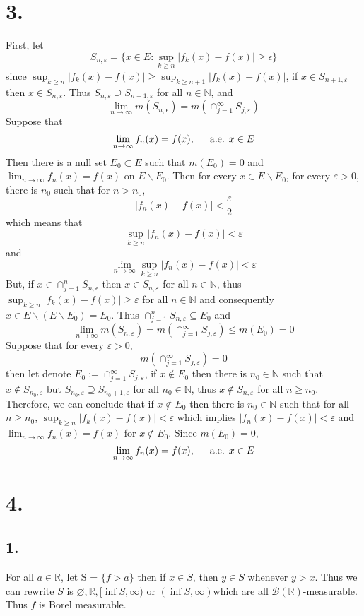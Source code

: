\documentclass[11pt]{article}
\theoremstyle{mystyle}
\theoremstyle{definition}
\begin{document}
\section*{3.}
First, let 
\[
  S_{n, \varepsilon} = \{x \in E: \sup_{k \ge n} |f_k(x) - f(x)| \ge \epsilon\}
\]
since $\sup_{k \ge n} |f_k(x) - f(x)| \ge \sup_{k \ge n+1} |f_k(x)-f(x)|$, if $x \in S_{n+1, \varepsilon}$ then $x \in S_{n, \varepsilon}$. Thus $S_{n, \varepsilon} \supseteq S_{n+1, \varepsilon}$ for all $n \in \mathbb{N}$, and 
\[
  \lim_{n \to \infty} m(S_{n, \epsilon}) = m(\cap_{j=1}^\infty S_{j, \varepsilon}) 
\]
Suppose that 
\[
  \lim_{n \to \infty} f_n(x) = f(x), \indent \text{a.e. } x \in E
\]
Then there is a null set $E_0 \subset E$ such that $m(E_0) = 0$ and $\lim_{n \to \infty} f_n(x) = f(x)$ on $E \backslash E_0$. Then for every $x \in E \backslash E_0$, for every $\varepsilon >0$, there is $n_0$ such that for $n>n_0$, 
\[
  |f_n(x) - f(x) | <\frac{\varepsilon}{2}
\]
which means that  
\[
  \sup_{k \ge n} |f_n(x) - f(x)| < \varepsilon
\]
and 
\[
  \lim_{n \to \infty} \sup_{k \ge n} |f_n(x) - f(x) | < \varepsilon
\]
But, if $x \in \cap_{j=1}^n S_{n, \epsilon}$ then $x \in S_{n, \varepsilon}$ for all $n \in \mathbb{N}$, thus $\sup_{k \ge n} |f_k(x) - f(x)| \ge \varepsilon$ for all $n \in \mathbb{N}$ and consequently $x \in E \backslash (E \backslash E_0) = E_0$. Thus $\cap_{j=1}^n S_{n, \varepsilon} \subseteq E_0$ and 
\[
  \lim_{n \to \infty} m(S_{n, \varepsilon}) = m(\cap_{j=1}^\infty S_{j, \varepsilon}) \le m(E_0) = 0 
\]
Suppose that for every $\varepsilon > 0$,  
\[
  m(\cap_{j=1}^\infty S_{j, \varepsilon}) = 0
\]
then let denote $E_0:= \cap_{j=1}^\infty S_{j, \varepsilon}$, if $x \notin E_0$ then there is $n_0 \in \mathbb{N}$ such that $x \notin S_{n_0, \varepsilon}$ but $S_{n_0, \varepsilon} \supseteq S_{n_0+1, \varepsilon}$ for all $n_0 \in \mathbb{N}$, thus $x \notin S_{n, \varepsilon}$ for all $n \ge n_0$. \\ 
Therefore, we can conclude that if $x \notin E_0$ then there is $n_0 \in \mathbb{N}$ such that for all $n \ge n_0$, $\sup_{k \ge n} |f_k(x) - f(x)| < \varepsilon$ which implies $|f_n(x) - f(x) | < \varepsilon$ and $\lim_{n \to \infty} f_n(x) = f(x)$ for $x \notin E_0$. Since $m(E_0) = 0$, 
\[
  \lim_{n \to \infty} f_n(x) = f(x), \indent \text{a.e. } x \in E
\]
\newpage
\section*{4.}
\subsection*{1.}
For all $a \in \mathbb{R}$, let S = $\{f>a\}$ then if $x \in S$, then $y \in S$ whenever $y > x$. Thus we can rewrite $S$ is $\varnothing, \mathbb{R}, [\inf S, \infty)$ or $(\inf S, \infty)$which are all $\mathcal{B}(\mathbb{R})$-measurable. Thus $f$ is Borel measurable. 
\end{document}
